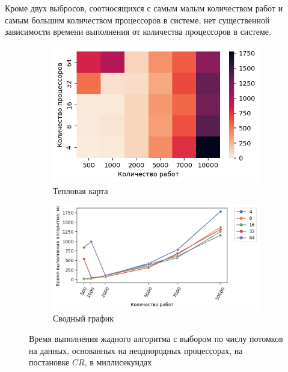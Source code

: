 Кроме двух выбросов, соотносящихся с самым малым количеством работ и самым большим количеством процессоров в системе, нет существенной зависимости времени выполнения от количества процессоров в системе.

\begin{figure}[!htbp]
    \centering
    \begin{subfigure}{0.49\textwidth}
        \includegraphics[width=\textwidth]{imgs/unbalanced/CR/et_heatmap.png}
        \caption{Тепловая карта}
        \label{fig:CR-disbalanced-exec-time-heatmap}
    \end{subfigure}
    \hfill
    \begin{subfigure}{0.49\textwidth}
        \includegraphics[width=\textwidth]{imgs/unbalanced/CR/tr_graph.png}
        \caption{Сводный график}
        \label{fig:CR-disbalanced-exec-time-compiled}
    \end{subfigure}
    \caption{Время выполнения жадного алгоритма с выбором по числу потомков на данных, основанных на неоднородных процессорах, на постановке $CR$, в миллисекундах}
\end{figure}

